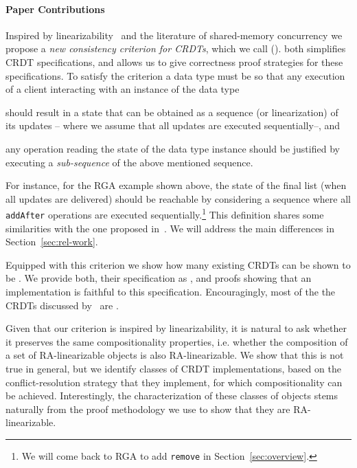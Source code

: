 \paragraph{Paper Contributions}
Inspired by linearizability~\cite{HerlihyW90} and the literature of
shared-memory concurrency we propose a \emph{new consistency criterion
  for CRDTs}, which we call \emph{\CRDTLin{}} (\CRDTLinshort{}).
%
\CRDTLinshort{} both simplifies CRDT specifications, and allows us to
give correctness proof strategies for these specifications.
%
To satisfy the \CRDTLinshort{} criterion a data type must be so that
any execution of a client interacting with an instance of the data
type
\begin{inparaenum}
\item should result in a state that can be obtained as a sequence (or
  linearization) of its updates -- where we assume that all updates
  are executed sequentially--, and
\item any operation reading the state of the data type instance should
  be justified by executing a \emph{sub-sequence} of the above
  mentioned sequence.
\end{inparaenum}
For instance, for the RGA example shown above, the state of the final
list (when all updates are delivered) should be reachable by considering a sequence where all
\lstinline|addAfter| operations are executed sequentially.\footnote{We
  will come back to RGA to add \lstinline|remove|
  in Section~\ref{sec:overview}.}
%
This definition shares some similarities with the one proposed
in~\cite{PerrinMJ14}. We will address the main differences
in Section~\ref{sec:rel-work}.

Equipped with this criterion we show how many existing CRDTs can be
shown to be \crdtlinearizable{}.
%
We provide both, their specification as \CRDTLinshort{}, and proofs
showing that an implementation is faithful to this specification.
%
Encouragingly, most of the the CRDTs discussed by~\citet{ShapiroPBZ11}
are \crdtlinearizable{}.

Given that our criterion is inspired by
linearizability, it is natural to ask whether it
preserves the same compositionality properties, i.e.
whether the composition of a set of RA-linearizable objects is also RA-linearizable.
%
We show that this is not true in general, but we identify classes of
CRDT implementations, based on the conflict-resolution strategy that
they implement, for which compositionality can be achieved. Interestingly, the characterization of these 
classes of objects stems naturally from the proof methodology we use to show that they are RA-linearizable.

